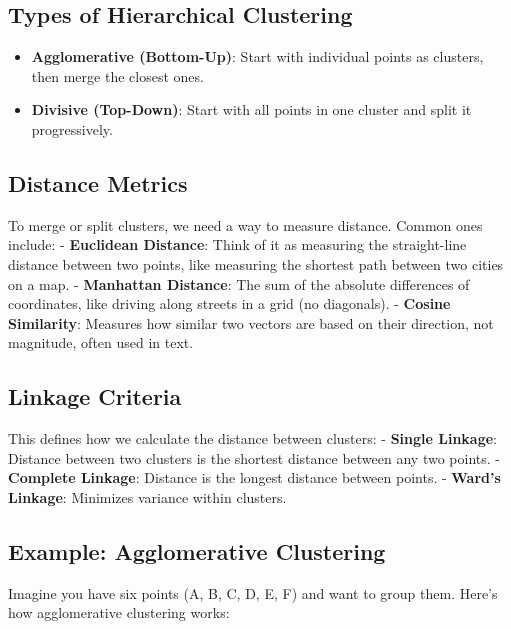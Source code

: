 \documentclass[
  letterpaper,
  DIV=11,
  numbers=noendperiod]{scrreprt}
\providecommand{\tightlist}{%
  \setlength{\itemsep}{0pt}\setlength{\parskip}{0pt}}\usepackage{longtable,booktabs,array}
\begin{document}
\subsection{Types of Hierarchical
Clustering}\label{types-of-hierarchical-clustering}

\begin{itemize}
\tightlist
\item
  \textbf{Agglomerative (Bottom-Up)}: Start with individual points as
  clusters, then merge the closest ones.
\item
  \textbf{Divisive (Top-Down)}: Start with all points in one cluster and
  split it progressively.
\end{itemize}

\subsection{Distance Metrics}\label{distance-metrics}

To merge or split clusters, we need a way to measure distance. Common
ones include: - \textbf{Euclidean Distance}: Think of it as measuring
the straight-line distance between two points, like measuring the
shortest path between two cities on a map. - \textbf{Manhattan
Distance}: The sum of the absolute differences of coordinates, like
driving along streets in a grid (no diagonals). - \textbf{Cosine
Similarity}: Measures how similar two vectors are based on their
direction, not magnitude, often used in text.

\subsection{Linkage Criteria}\label{linkage-criteria}

This defines how we calculate the distance between clusters: -
\textbf{Single Linkage}: Distance between two clusters is the shortest
distance between any two points. - \textbf{Complete Linkage}: Distance
is the longest distance between points. - \textbf{Ward's Linkage}:
Minimizes variance within clusters.

\subsection{Example: Agglomerative
Clustering}\label{example-agglomerative-clustering}

Imagine you have six points (A, B, C, D, E, F) and want to group them.
Here's how agglomerative clustering works:
\end{document}
